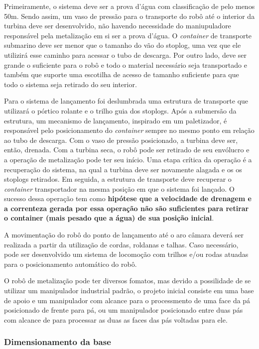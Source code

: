 Primeiramente, o sistema deve ser a prova d'água com classificação de pelo
menos 50m.
Sendo assim, um vaso de pressão para o transporte do robô até o interior da turbina deve ser
desenvolvido, não havendo necessidade do maniupuladore responsável pela
metalização em si ser a prova d'água. O \textit{container} de transporte
submarino deve ser menor que o tamanho do vão do stoplog, uma vez que ele
utilizirá esse caminho para acessar o tubo de descarga. Por outro lado, deve ser
grande o suficiente para o robô e todo o material necessário seja transportado e
também que suporte uma escotilha de acesso de tamanho suficiente para que todo o
sistema seja retirado do seu interior.

Para o sistema de lançamento foi deslumbrada uma estrutura de transporte que
utilizará o pórtico rolante e o trilho guia dos stoplogs. Após a submersão da
estrutura, um mecanismo de lançamento, inspirado em um paletizador, é
responsável pelo posicionamento do \textit{container} sempre no mesmo ponto em
relação ao tubo de descarga. Com o vaso de pressão posicionado, a turbina deve
ser, então, drenada. Com a turbina seca, o robô pode ser retirado de seu
envólucro e a operação de metalização pode ter seu início. Uma etapa crítica da
operação é a recuperação do sistema, na qual a turbina deve ser novamente
alagada e os os stoplogs retirados. Em seguida, a estrutura de transporte deve
recuperar o \textit{container} transportador na mesma posição em que o sistema
foi lançado. O sucesso dessa operação tem como \textbf{hipótese que a velocidade
de drenagem e a correnteza gerada por essa operação não são suficientes para
retirar o container (mais pesado que a água) de sua posição inicial}. 

A movimentação do robô do ponto de lançamento até o aro câmara deverá ser
realizada a partir da utilização de cordas, roldanas e talhas. Caso necessário,
pode ser desenvolvido um sistema de locomoção com trilhos e/ou rodas atuadas
para o posicionamento automático do robô.

O robô de metalização pode ter diversos fomatos, mas devido a possilidade de se
utilizar um manipulador industrial padrão, o projeto inicial consiste em uma
base de apoio e um manipulador com alcance para o processmento de uma face da pá
posicionado de frente para pá, ou um manipulador posicionado entre duas pás com
alcance de para processar as duas as faces das pás voltadas para ele.

\subsubsection{Dimensionamento da base}


